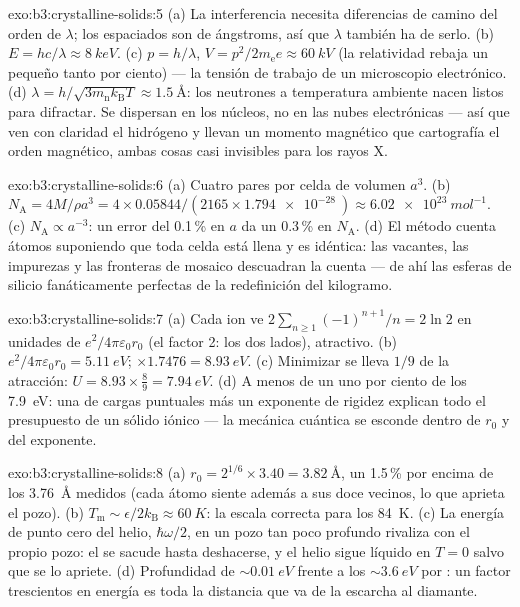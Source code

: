 \begin{solution}{exo:b3:crystalline-solids:5}
(a) La interferencia necesita diferencias de camino del orden de $\lambda$;
los espaciados son de ángstroms, así que $\lambda$ también ha de serlo. (b) $E =
hc/\lambda \approx \qty{8}{keV}$. (c) $p = h/\lambda$, $V =
p^2/2m_{\text{e}}e \approx \qty{60}{kV}$ (la relatividad rebaja un pequeño
tanto por ciento) --- la tensión de trabajo de un microscopio electrónico. (d)
$\lambda = h/\sqrt{3m_{\text{n}}k_{\text{B}}T} \approx
\qty{1.5}{\angstrom}$: los neutrones a temperatura ambiente nacen
listos para difractar. Se dispersan en los núcleos, no en las nubes electrónicas
--- así que ven con claridad el hidrógeno y llevan un momento magnético
que cartografía el orden magnético, ambas cosas casi invisibles para los rayos X.
\end{solution}

\begin{solution}{exo:b3:crystalline-solids:6}
(a) Cuatro pares por celda de volumen $a^3$. (b) $N_{\text{A}} =
4M/\rho a^3 = 4\times0.05844/(2165\times\qty{1.794e-28}{})
\approx \qty{6.02e23}{mol^{-1}}$. (c) $N_{\text{A}} \propto
a^{-3}$: un error del 0.1\,\% en $a$ da un 0.3\,\% en $N_{\text{A}}$. (d)
El método cuenta átomos suponiendo que toda celda está llena y es
idéntica: las vacantes, las impurezas y las fronteras de mosaico descuadran
la cuenta --- de ahí las esferas de silicio fanáticamente perfectas de la
redefinición del kilogramo.
\end{solution}

\begin{solution}{exo:b3:crystalline-solids:7}
(a) Cada ion ve $2\sum_{n\ge1}(-1)^{n+1}/n = 2\ln2$ en unidades de
$e^2/4\pi\varepsilon_0r_0$ (el factor 2: los dos lados), atractivo. (b)
$e^2/4\pi\varepsilon_0r_0 = \qty{5.11}{eV}$; $\times1.7476 =
\qty{8.93}{eV}$. (c) Minimizar se lleva $1/9$ de la atracción:
$U = 8.93\times\tfrac89 = \qty{7.94}{eV}$. (d) A menos de un uno por ciento
de los \qty{7.9}{eV}: una  de cargas puntuales más un exponente de rigidez
explican todo el presupuesto de un sólido iónico --- la mecánica
cuántica se esconde dentro de $r_0$ y del exponente.
\end{solution}

\begin{solution}{exo:b3:crystalline-solids:8}
(a) $r_0 = 2^{1/6}\times3.40 = \qty{3.82}{\angstrom}$, un 1.5\,\%
por encima de los \qty{3.76}{\angstrom} medidos (cada átomo siente además
a sus doce vecinos, lo que aprieta el pozo). (b)
$T_{\text{m}} \sim \epsilon/2k_{\text{B}} \approx \qty{60}{K}$:
la escala correcta para los \qty{84}{K}. (c) La energía de punto cero del helio,
$\hbar\omega/2$, en un pozo tan poco profundo rivaliza con el propio pozo: el
 se sacude hasta deshacerse, y el helio sigue líquido en $T = 0$
salvo que se lo apriete. (d) Profundidad de $\sim\qty{0.01}{eV}$ frente a los
$\sim\qty{3.6}{eV}$ por : un factor trescientos en energía es
toda la distancia que va de la escarcha al diamante.
\end{solution}

